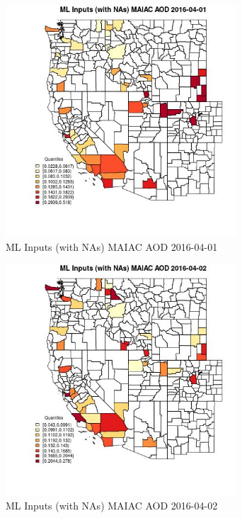 \begin{figure} 
\centering  
\includegraphics[width=0.77\textwidth]{Code_Outputs/Report_ML_input_PM25_Step4_part_e_de_duplicated_aveswNAs_CountyMAIAC_AODMean2016-04-01_2016-04-01.jpg} 
\caption{\label{fig:Report_ML_input_PM25_Step4_part_e_de_duplicated_aveswNAsCountyMAIAC_AODMean2016-04-01_2016-04-01}ML Inputs (with NAs) MAIAC AOD 2016-04-01} 
\end{figure} 
 

\begin{figure} 
\centering  
\includegraphics[width=0.77\textwidth]{Code_Outputs/Report_ML_input_PM25_Step4_part_e_de_duplicated_aveswNAs_CountyMAIAC_AODMean2016-04-02_2016-04-02.jpg} 
\caption{\label{fig:Report_ML_input_PM25_Step4_part_e_de_duplicated_aveswNAsCountyMAIAC_AODMean2016-04-02_2016-04-02}ML Inputs (with NAs) MAIAC AOD 2016-04-02} 
\end{figure} 
 

